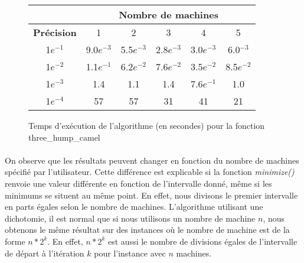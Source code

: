     \begin{figure}[!h]
        \begin{center}
            \begin{tabular}{|c|c|c|c|c|c|}
            \hline
                 & \multicolumn{5}{c|}{\textbf{Nombre de machines}} \\ \hline
                \textbf{Précision} & 1 & 2 & 3 & 4 & 5 \\ \hline
                1$e^{-1}$ & 9.0$e^{-3}$ & 5.5$e^{-3}$ & 2.8$e^{-3}$ & 3.0$e^{-3}$ & 6.0$^{-3}$ \\ \hline
                1$e^{-2}$ & 1.1$e^{-1}$ & 6.2$e^{-2}$ & 7.6$e^{-2}$ & 3.5$e^{-2}$ & 8.5$e^{-2}$ \\ \hline
                1$e^{-3}$ & 1.4 & 1.1 & 1.4 & 7.6$e^{-1}$ & 1.0 \\ \hline
                1$e^{-4}$ & 57 & 57 & 31 & 41 & 21 \\ \hline
            \end{tabular}
            \caption{Temps d'exécution de l'algorithme (en secondes) pour la fonction three\_hump\_camel}
            \label{tab:mpi-three-hump-camel}
        \end{center}
    \end{figure}
    
    \FloatBarrier
    
    \paragraph{}
    On observe que les résultats peuvent changer en fonction du nombre de machines spécifié par l'utilisateur. Cette différence est explicable si la fonction \textit{minimize()} renvoie une valeur différente en fonction de l'intervalle donné, même si les minimums se situent au même point. En effet, nous divisons le premier intervalle en parts égales selon le nombre de machines. L'algorithme utilisant une dichotomie, il est normal que si nous utilisons un nombre de machine $n$, nous obtenons le même résultat sur des instances où le nombre de machine est de la forme $n*2^k$. En effet, $n*2^k$ est aussi le nombre de divisions égales de l'intervalle de départ à l'itération $k$ pour l'instance avec $n$ machines.
    
    \FloatBarrier
    
